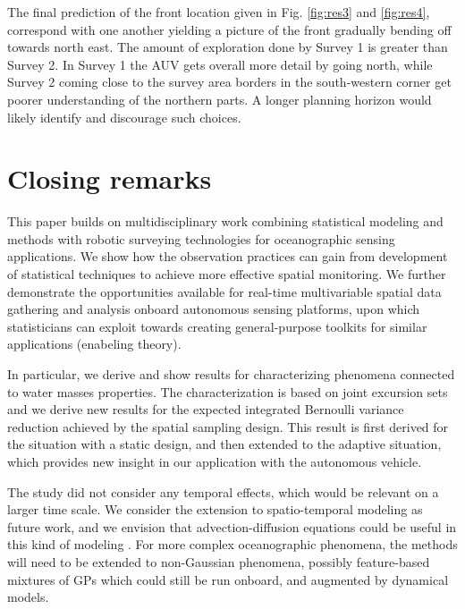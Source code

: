 \documentclass[aoas]{imsart}
\begin{document}
The final prediction of the front location given in Fig. \ref{fig:res3} and \ref{fig:res4}, correspond with one another yielding a picture of the front gradually bending off towards north east. The amount of exploration done by Survey 1 is greater than Survey 2. In Survey 1 the AUV gets overall more detail by going north, while Survey 2 coming close to the survey area borders in the south-western corner get poorer understanding of the northern parts. A longer planning horizon would likely identify and discourage such choices.


\section{Closing remarks}\label{sec:concl_disc}

This paper builds on multidisciplinary work combining statistical modeling and methods with robotic surveying technologies for oceanographic sensing applications. We show how the observation practices can gain from development of statistical techniques to achieve more effective spatial monitoring. We further demonstrate the opportunities available for real-time multivariable spatial data gathering and analysis onboard autonomous sensing platforms, upon which statisticians can exploit towards creating general-purpose toolkits for similar applications (enabeling theory).

In particular, we derive and show results for characterizing phenomena connected to water masses properties. The characterization is based on joint excursion sets and we derive new results for the expected integrated Bernoulli variance reduction achieved by the spatial sampling design. This result is first derived for the situation with a static design, and then extended to the adaptive situation, which provides new insight in our application with the autonomous vehicle.

The study did not consider any temporal effects, which would be relevant on a larger time scale. We consider the extension to spatio-temporal modeling as future work, and we envision that advection-diffusion equations could be useful in this kind of modeling \citep{sigrist2015stochastic}. For more complex oceanographic phenomena, the methods will need to be extended to non-Gaussian phenomena, possibly feature-based mixtures of GPs which could still be run onboard, and augmented by dynamical models. 
\end{document}
